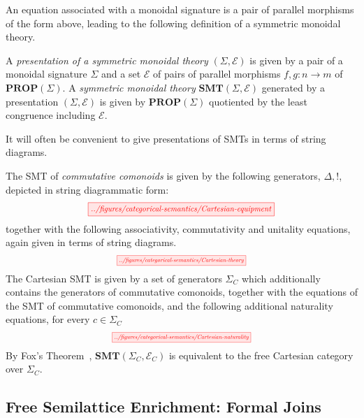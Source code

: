 An equation associated with a monoidal signature is a pair of parallel morphisms of the form above, leading to the following definition of a symmetric monoidal theory. 
\begin{definition}
A \textit{presentation of a symmetric monoidal theory} $(\Sigma, \mathcal{E})$ is given by a pair of a monoidal signature $\Sigma$ and a set $\mathcal{E}$ of pairs of parallel morphisms $f,g: n \to m$ of $\textbf{PROP}(\Sigma)$.
A \textit{symmetric monoidal theory} $\textbf{SMT}(\Sigma,\mathcal{E})$ generated by a presentation $(\Sigma, \mathcal{E})$ is given by $\textbf{PROP}(\Sigma)$ quotiented by the least congruence including $\mathcal{E}$.
\end{definition}

It will often be convenient to give presentations of SMTs in terms of string diagrams.
\begin{example}
The SMT of \textit{commutative comonoids} is given by the following generators, ${\Delta, !}$, depicted in string diagrammatic form:
\[
	\scalebox{0.8}{
  	 \tikzfig{../figures/categorical-semantics/Cartesian-equipment}
	}
\]
together with the following associativity, commutativity and unitality equations, again given in terms of string diagrams. 
\[
	\scalebox{0.6}{
	\tikzfig{../figures/categorical-semantics/Cartesian-theory}	
	}
\]
The Cartesian SMT is given by a set of generators $\Sigma_C$ which additionally contains the generators of commutative comonoids, together with the equations of the SMT of commutative comonoids, and the following additional naturality equations, for every $c \in \Sigma_C$
\[
	\scalebox{0.6}{
	\tikzfig{../figures/categorical-semantics/Cartesian-naturality}
	}
\]
By Fox's Theorem~\cite{fox},  $\textbf{SMT}(\Sigma_C, \mathcal{E}_C)$ is equivalent to the free Cartesian category over $\Sigma_C$. 
\end{example}

\subsection{Free Semilattice Enrichment: Formal Joins}

